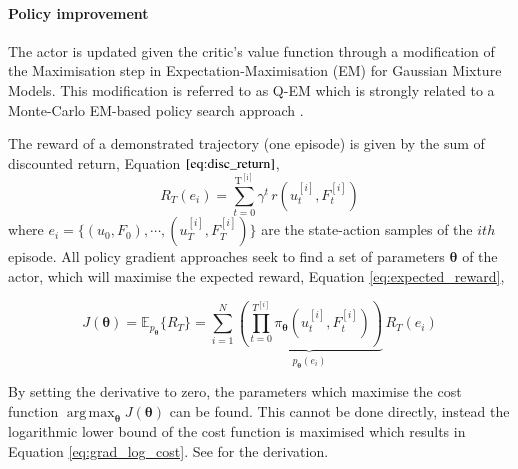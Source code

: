 \documentclass[final,5p,times,twocolumn]{elsarticle}
\newcommand{\Param}{\boldsymbol{\theta}}
\DeclareMathOperator*{\argmax}{arg\,max}
\begin{document}
\paragraph{Policy improvement}

The actor is updated given the critic's value function through a modification of the Maximisation step in  Expectation-Maximisation (EM) 
for Gaussian Mixture Models. This modification is referred to as Q-EM which is strongly related to a Monte-Carlo EM-based policy 
search approach \cite[p.50]{p_search_surv_2011}. 

The reward of a demonstrated trajectory (one episode) is given by the sum of discounted return, Equation $\ref{eq:disc_return}$,
\begin{equation}\label{eq:disc_return}
 R_T(e_i) = \sum_{t=0}^{\mathrm{T^{[i]}}} \gamma^t \, r(u^{[i]}_t,F^{[i]}_t)
\end{equation}
where $e_i = \{(u_0,F_0),\cdots,(u_T^{[i]},F_T^{[i]}) \}$ are the state-action samples of the $ith$ episode.
All policy gradient approaches seek to find a set of parameters $\Param$ of the actor,
which will maximise the expected reward, Equation \ref{eq:expected_reward},

\begin{equation}\label{eq:expected_reward}
 J(\Param) = \mathbb{E}_{p_{\Param}}\{R_T\} = \sum\limits_{i=1}^{N}
 \underbrace{\left( \prod_{t=0}^{T^{[i]}} \pi_{\Param}(u^{[i]}_t,F^{[i]}_t) \right)}_{p_{\Param}(e_i)} \, R_T(e_i) 
\end{equation}

By setting the derivative to zero, the parameters which maximise the cost function $\argmax_{\Param} J(\Param)$
can be found. This cannot be done directly, instead the logarithmic lower bound of the cost function is maximised which results in 
Equation \ref{eq:grad_log_cost}. See \cite[p.50]{p_search_surv_2011} for the derivation. 
\end{document}
